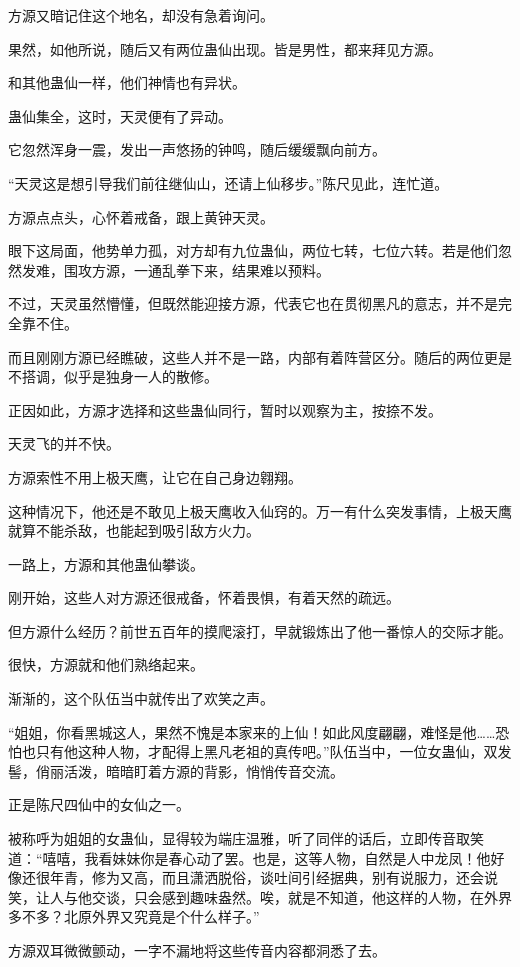 \begin{this_body}
方源又暗记住这个地名，却没有急着询问。

果然，如他所说，随后又有两位蛊仙出现。皆是男性，都来拜见方源。

和其他蛊仙一样，他们神情也有异状。

蛊仙集全，这时，天灵便有了异动。

它忽然浑身一震，发出一声悠扬的钟鸣，随后缓缓飘向前方。

“天灵这是想引导我们前往继仙山，还请上仙移步。”陈尺见此，连忙道。

方源点点头，心怀着戒备，跟上黄钟天灵。

眼下这局面，他势单力孤，对方却有九位蛊仙，两位七转，七位六转。若是他们忽然发难，围攻方源，一通乱拳下来，结果难以预料。

不过，天灵虽然懵懂，但既然能迎接方源，代表它也在贯彻黑凡的意志，并不是完全靠不住。

而且刚刚方源已经瞧破，这些人并不是一路，内部有着阵营区分。随后的两位更是不搭调，似乎是独身一人的散修。

正因如此，方源才选择和这些蛊仙同行，暂时以观察为主，按捺不发。

天灵飞的并不快。

方源索性不用上极天鹰，让它在自己身边翱翔。

这种情况下，他还是不敢见上极天鹰收入仙窍的。万一有什么突发事情，上极天鹰就算不能杀敌，也能起到吸引敌方火力。

一路上，方源和其他蛊仙攀谈。

刚开始，这些人对方源还很戒备，怀着畏惧，有着天然的疏远。

但方源什么经历？前世五百年的摸爬滚打，早就锻炼出了他一番惊人的交际才能。

很快，方源就和他们熟络起来。

渐渐的，这个队伍当中就传出了欢笑之声。

“姐姐，你看黑城这人，果然不愧是本家来的上仙！如此风度翩翩，难怪是他……恐怕也只有他这种人物，才配得上黑凡老祖的真传吧。”队伍当中，一位女蛊仙，双发髻，俏丽活泼，暗暗盯着方源的背影，悄悄传音交流。

正是陈尺四仙中的女仙之一。

被称呼为姐姐的女蛊仙，显得较为端庄温雅，听了同伴的话后，立即传音取笑道：“嘻嘻，我看妹妹你是春心动了罢。也是，这等人物，自然是人中龙凤！他好像还很年青，修为又高，而且潇洒脱俗，谈吐间引经据典，别有说服力，还会说笑，让人与他交谈，只会感到趣味盎然。唉，就是不知道，他这样的人物，在外界多不多？北原外界又究竟是个什么样子。”

方源双耳微微颤动，一字不漏地将这些传音内容都洞悉了去。


\end{this_body}
